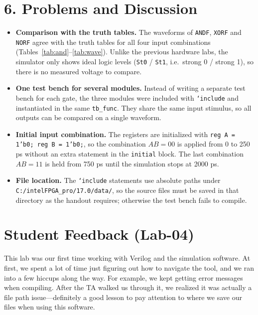 \section*{6. Problems and Discussion}

\begin{itemize}[leftmargin=*]
    \item \textbf{Comparison with the truth tables.} The waveforms of \texttt{ANDF}, \texttt{XORF} and \texttt{NORF} agree with the truth tables for all four input combinations (Tables~\ref{tab:and}--\ref{tab:wave}). Unlike the previous hardware labs, the simulator only shows ideal logic levels (\texttt{St0} / \texttt{St1}, i.e.\ strong 0 / strong 1), so there is no measured voltage to compare.
    \item \textbf{One test bench for several modules.} Instead of writing a separate test bench for each gate, the three modules were included with \texttt{`include} and instantiated in the same \texttt{tb\_func}. They share the same input stimulus, so all outputs can be compared on a single waveform.
    \item \textbf{Initial input combination.} The registers are initialized with \texttt{reg A = 1'b0; reg B = 1'b0;}, so the combination $AB=00$ is applied from 0 to 250 ps without an extra statement in the \texttt{initial} block. The last combination $AB=11$ is held from 750 ps until the simulation stops at 2000 ps.
    \item \textbf{File location.} The \texttt{`include} statements use absolute paths under \texttt{C:/intelFPGA\_pro/17.0/data/}, so the source files must be saved in that directory as the handout requires; otherwise the test bench fails to compile.
\end{itemize}

\section*{Student Feedback (Lab-04)}

This lab was our first time working with Verilog and the simulation software. At first, we spent a lot of time just figuring out how to navigate the tool, and we ran into a few hiccups along the way. For example, we kept getting error messages when compiling. After the TA walked us through it, we realized it was actually a file path issue—definitely a good lesson to pay attention to where we save our files when using this software.


